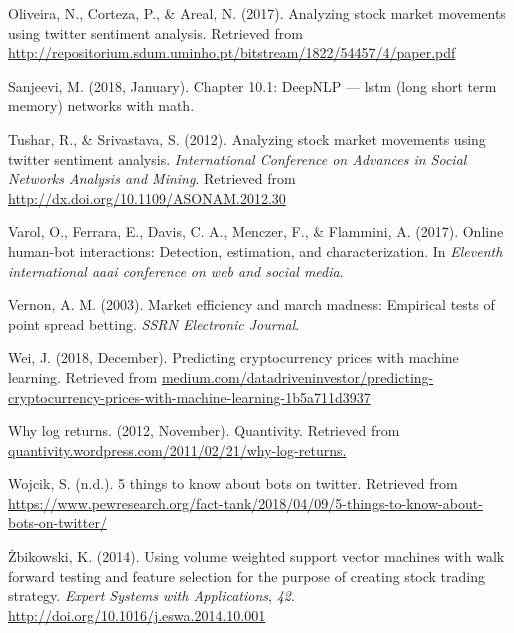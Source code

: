 \documentclass[12pt,twoside]{dukestatscithesis}
\begin{document}
\hypertarget{ref-oliviera2017}{}
Oliveira, N., Corteza, P., \& Areal, N. (2017). Analyzing stock market
movements using twitter sentiment analysis. Retrieved from
\url{http://repositorium.sdum.uminho.pt/bitstream/1822/54457/4/paper.pdf}

\hypertarget{ref-sanjeevi2018}{}
Sanjeevi, M. (2018, January). Chapter 10.1: DeepNLP --- lstm (long short
term memory) networks with math.

\hypertarget{ref-rao2012}{}
Tushar, R., \& Srivastava, S. (2012). Analyzing stock market movements
using twitter sentiment analysis. \emph{International Conference on
Advances in Social Networks Analysis and Mining}. Retrieved from
\url{http://dx.doi.org/10.1109/ASONAM.2012.30}

\hypertarget{ref-varol2017}{}
Varol, O., Ferrara, E., Davis, C. A., Menczer, F., \& Flammini, A.
(2017). Online human-bot interactions: Detection, estimation, and
characterization. In \emph{Eleventh international aaai conference on web
and social media}.

\hypertarget{ref-vernon2003}{}
Vernon, A. M. (2003). Market efficiency and march madness: Empirical
tests of point spread betting. \emph{SSRN Electronic Journal}.

\hypertarget{ref-wei2018}{}
Wei, J. (2018, December). Predicting cryptocurrency prices with machine
learning. Retrieved from
\url{medium.com/datadriveninvestor/predicting-cryptocurrency-prices-with-machine-learning-1b5a711d3937}

\hypertarget{ref-quant2012}{}
Why log returns. (2012, November). Quantivity. Retrieved from
\url{quantivity.wordpress.com/2011/02/21/why-log-returns.}

\hypertarget{ref-wojcik2018}{}
Wojcik, S. (n.d.). 5 things to know about bots on twitter. Retrieved
from
\url{https://www.pewresearch.org/fact-tank/2018/04/09/5-things-to-know-about-bots-on-twitter/}

\hypertarget{ref-zib2014}{}
Żbikowski, K. (2014). Using volume weighted support vector machines with
walk forward testing and feature selection for the purpose of creating
stock trading strategy. \emph{Expert Systems with Applications},
\emph{42}. \url{http://doi.org/10.1016/j.eswa.2014.10.001}


\end{document}
